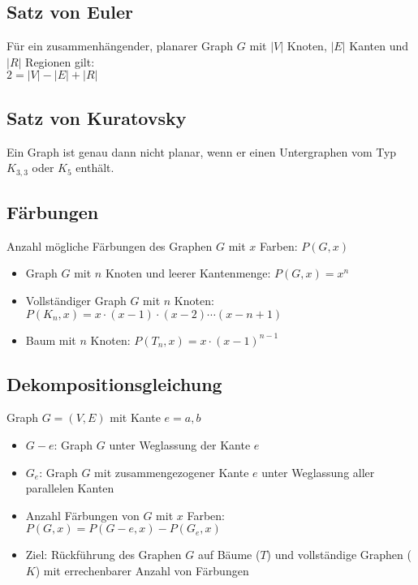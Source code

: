 \subsection{Satz von Euler}

Für ein zusammenhängender, planarer Graph $G$ mit $|V|$ Knoten, $|E|$ Kanten und $|R|$ Regionen gilt:
\\
$2 = |V| - |E| + |R|$

\subsection{Satz von Kuratovsky}

Ein Graph ist genau dann nicht planar, wenn er einen Untergraphen vom Typ $K_{3,3}$ oder $K_5$ enthält.

\subsection{Färbungen}

Anzahl mögliche Färbungen des Graphen $G$ mit $x$ Farben: $P(G,x)$

\begin{itemize}
    \item{Graph $G$ mit $n$ Knoten und leerer Kantenmenge: $P(G,x)=x^n$}
    \item{Vollständiger Graph $G$ mit $n$ Knoten: $P(K_n,x)=x \cdot (x-1) \cdot (x-2) \cdots (x-n+1)$}
    \item{Baum mit $n$ Knoten: $P(T_n,x)=x \cdot (x-1)^{n-1}$}
\end{itemize}

\subsection{Dekompositionsgleichung}

Graph $G = (V,E)$ mit Kante $e={a,b}$

\begin{itemize}
    \item{$G-e$: Graph $G$ unter Weglassung der Kante $e$}
    \item{$G_e$: Graph $G$ mit zusammengezogener Kante $e$ unter Weglassung aller parallelen Kanten}
    \item{Anzahl Färbungen von $G$ mit $x$ Farben: $P(G,x)=P(G-e,x)-P(G_e,x)$}
    \item{Ziel: Rückführung des Graphen $G$ auf Bäume ($T$) und vollständige Graphen ($K$) mit errechenbarer Anzahl von Färbungen}
\end{itemize}

